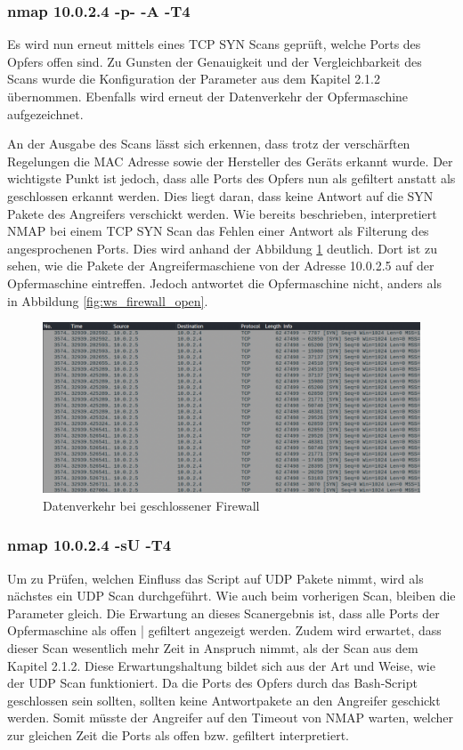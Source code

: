 \subsubsection{nmap 10.0.2.4 -p- -A -T4}
Es wird nun erneut mittels eines TCP SYN Scans geprüft, welche Ports des Opfers offen sind. Zu Gunsten der Genauigkeit und der Vergleichbarkeit des Scans wurde die Konfiguration der Parameter aus dem Kapitel 2.1.2 übernommen.
Ebenfalls wird erneut der Datenverkehr der Opfermaschine aufgezeichnet. 
\newpage


An der Ausgabe des Scans lässt sich erkennen, dass trotz der verschärften Regelungen die MAC Adresse sowie der Hersteller des Geräts erkannt wurde. 
Der wichtigste Punkt ist jedoch, dass alle Ports des Opfers nun als gefiltert anstatt als geschlossen erkannt werden. Dies liegt daran, dass keine Antwort auf die SYN Pakete des Angreifers verschickt werden. Wie bereits beschrieben, interpretiert NMAP bei einem TCP SYN Scan das Fehlen einer Antwort als Filterung des angesprochenen Ports. Dies wird anhand der Abbildung \ref{fig:ws_firewall_closed} deutlich. Dort ist zu sehen, wie die Pakete der Angreifermaschiene von der Adresse 10.0.2.5 auf der Opfermaschine eintreffen. Jedoch antwortet die Opfermaschine nicht, anders als in Abbildung \ref{fig:ws_firewall_open}.

\begin{figure}
	\includegraphics[width=\linewidth]{img/ws_firewall_closed.png}
	\caption{Datenverkehr bei geschlossener Firewall}
	\label{fig:ws_firewall_closed}
\end{figure}

\subsubsection{nmap 10.0.2.4 -sU -T4}
Um zu Prüfen, welchen Einfluss das Script auf UDP Pakete nimmt, wird als nächstes ein UDP Scan durchgeführt. Wie auch beim vorherigen Scan, bleiben die Parameter gleich. Die Erwartung an dieses Scanergebnis ist, dass alle Ports der Opfermaschine als offen | gefiltert angezeigt werden. Zudem wird erwartet, dass dieser Scan wesentlich mehr Zeit in Anspruch nimmt, als der Scan aus dem Kapitel 2.1.2. Diese Erwartungshaltung bildet sich aus der Art und Weise, wie der UDP Scan funktioniert. Da die Ports des Opfers durch das Bash-Script geschlossen sein sollten, sollten keine Antwortpakete an den Angreifer geschickt werden. Somit müsste der Angreifer auf den Timeout von NMAP warten, welcher zur gleichen Zeit die Ports als offen bzw. gefiltert interpretiert.

